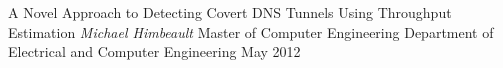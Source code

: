 \documentclass[dvips,letterpaper,12pt]{report}
\begin{document}


\thesistitle
	{A Novel Approach to Detecting Covert DNS Tunnels Using Throughput Estimation}
	{\emph{Michael Himbeault}}
	{Master of Computer Engineering}
	{Department of Electrical and Computer Engineering}
	{May 2012}
















\appendix

\end{document}
